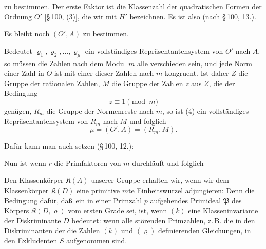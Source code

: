 
zu bestimmen. Der erste Faktor ist die Klassenzahl der quadratischen Formen der Ordnung $O'$ [\S\,100, (3)], die wir mit $H'$ bezeichnen. Es ist also
(nach \S\,100, 13.).

Es bleibt noch $(O', A)$ zu bestimmen.

Bedeutet $\varrho_1, \varrho_2, \dots, \varrho_\mu$ ein vollst\"andiges Repr\"asentantensystem von $O'$ nach $A$, so m\"ussen die Zahlen
nach dem Modul $m$ alle verschieden sein, und jede Norm einer Zahl in $O$ ist mit einer dieser Zahlen nach $m$ kongruent. Ist daher $Z$ die Gruppe der rationalen Zahlen, $M$ die Gruppe der Zahlen $z$ aus $Z$, die der Bedingung
\[
z \equiv 1 \pmod{m}
\]
gen\"ugen, $R_m$ die Gruppe der Normenreste nach $m$, so ist (4) ein vollst\"andiges Repr\"asentantensystem von $R_m$ nach $M$ und folglich
\[
\mu = (O', A) = (R_m, M).
\]

Daf\"ur kann man auch setzen (\S\,100, 12.):

Nun ist
wenn $r$ die Primfaktoren von $m$ durchl\"auft und folglich

Den Klassenk\"orper $\mathfrak{K}(A)$ unserer Gruppe erhalten wir, wenn wir dem Klassenk\"orper $\mathfrak{K}(D)$ eine primitive $m$te Einheitswurzel adjungieren:
Denn die Bedingung daf\"ur, da\ss\ ein in einer Primzahl $p$ aufgehendes Primideal $\mathfrak{P}$ des K\"orpers $\mathfrak{K}(D,\varrho)$ vom ersten Grade sei, ist, wenn $(k)$ eine Klasseninvariante der Diskriminante $D$ bedeutet:
wenn alle st\"orenden Primzahlen, z.\,B. die in den Diskriminanten der die Zahlen $(k)$ und $(\varrho)$ definierenden Gleichungen, in den Exkludenten $S$ aufgenommen sind.
